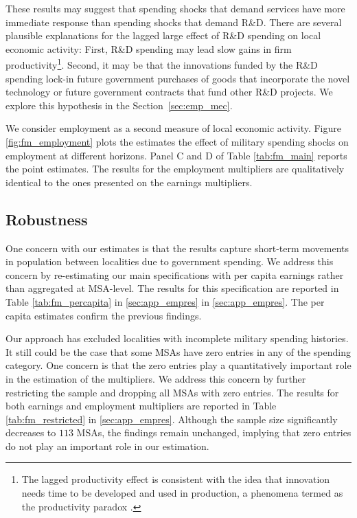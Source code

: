 \documentclass[dv_diss_main.tex]{subfiles}
\begin{document}
These results may suggest that spending shocks that demand services have more immediate response than spending shocks that demand R\&D. There are several plausible explanations for the lagged large effect of R\&D spending on local economic activity: First, R\&D spending may lead slow gains in firm productivity\footnote{The lagged productivity effect is consistent with the idea that innovation needs time to be developed and used in production, a phenomena termed as the productivity paradox \citep{Huggett2001,Acemoglu2014}.}. Second, it may be that the innovations funded by the R\&D spending lock-in future government purchases of goods that incorporate the novel technology or future government contracts that fund other R\&D projects. We explore this hypothesis in the Section~\ref{sec:emp_mec}.


We consider employment as a second measure of local economic activity. Figure \ref{fig:fm_employment} plots the estimates the effect of military spending shocks on employment at different horizons. Panel C and D of Table \ref{tab:fm_main} reports the point estimates. The results for the employment multipliers are qualitatively identical to the ones presented on the earnings multipliers. 

\subsection{Robustness}

One concern with our estimates is that the results capture short-term movements in population between localities due to government spending. We address this concern by re-estimating our main specifications with per capita earnings rather than aggregated at MSA-level. The results for this specification are reported in Table \ref{tab:fm_percapita} in \ref{sec:app_empres} in \ref{sec:app_empres}. The per capita estimates confirm the previous findings.

Our approach has excluded localities with incomplete military spending histories. It still could be the case that some MSAs have zero entries in any of the spending category. One concern is that the zero entries play a quantitatively important role in the estimation of the multipliers. We address this concern by further restricting the sample and dropping all MSAs with zero entries. The results for both earnings and employment multipliers are reported in Table \ref{tab:fm_restricted} in \ref{sec:app_empres}. Although the sample size significantly decreases to $113$ MSAs, the findings remain unchanged, implying that zero entries do not play an important role in our estimation.
\end{document}
